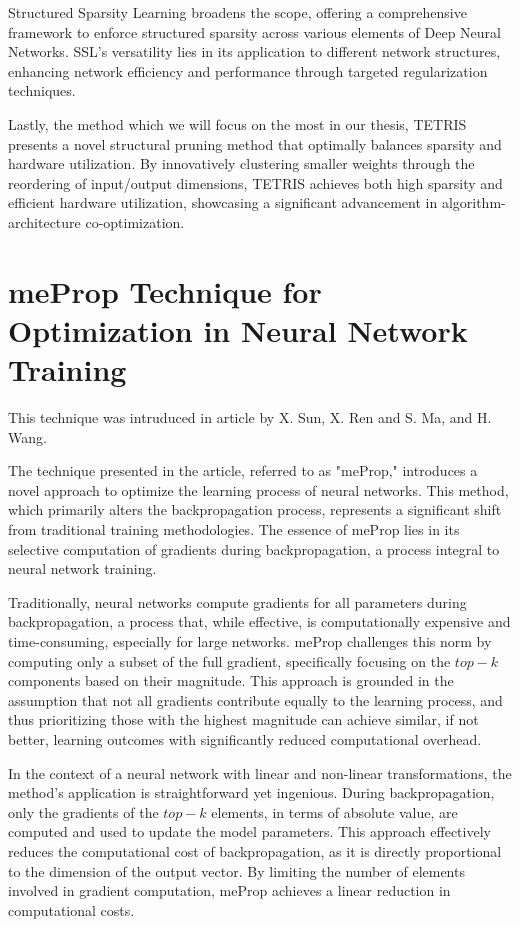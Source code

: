 Structured Sparsity Learning broadens the scope, offering a comprehensive framework to enforce structured sparsity across various elements of Deep Neural Networks. SSL's versatility lies in its application to different network structures, enhancing network efficiency and performance through targeted regularization techniques.

Lastly, the method which we will focus on the most in our thesis, TETRIS presents a novel structural pruning method that optimally balances sparsity and hardware utilization. By innovatively clustering smaller weights through the reordering of input/output dimensions, TETRIS achieves both high sparsity and efficient hardware utilization, showcasing a significant advancement in algorithm-architecture co-optimization.

\section{meProp Technique for Optimization in Neural Network Training}
This technique was intruduced in article \cite{meprop} by X. Sun, X. Ren and S. Ma, and H. Wang.

The technique presented in the article, referred to as "meProp," introduces a novel approach to optimize the learning process of neural networks. This method, which primarily alters the backpropagation process, represents a significant shift from traditional training methodologies. The essence of meProp lies in its selective computation of gradients during backpropagation, a process integral to neural network training.

Traditionally, neural networks compute gradients for all parameters during backpropagation, a process that, while effective, is computationally expensive and time-consuming, especially for large networks. meProp challenges this norm by computing only a subset of the full gradient, specifically focusing on the $top-k$ components based on their magnitude. This approach is grounded in the assumption that not all gradients contribute equally to the learning process, and thus prioritizing those with the highest magnitude can achieve similar, if not better, learning outcomes with significantly reduced computational overhead.

In the context of a neural network with linear and non-linear transformations, the method's application is straightforward yet ingenious. During backpropagation, only the gradients of the $top-k$ elements, in terms of absolute value, are computed and used to update the model parameters. This approach effectively reduces the computational cost of backpropagation, as it is directly proportional to the dimension of the output vector. By limiting the number of elements involved in gradient computation, meProp achieves a linear reduction in computational costs.

